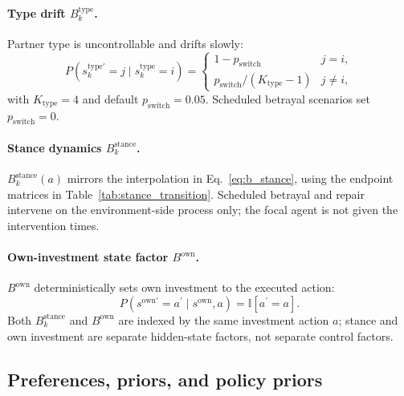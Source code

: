 \paragraph{Type drift \(B_k^{\mathrm{type}}\).}
Partner type is uncontrollable and drifts slowly:
\begin{equation}
P(s_k^{\mathrm{type}\prime}=j\mid s_k^{\mathrm{type}}=i)=
\begin{cases}
1-p_{\mathrm{switch}} & j=i,\\
p_{\mathrm{switch}}/(K_{\mathrm{type}}-1) & j\neq i,
\end{cases}
\label{eq:b_type}
\end{equation}
with $K_{\mathrm{type}}=4$ and default $p_{\mathrm{switch}}=0.05$. Scheduled betrayal scenarios set $p_{\mathrm{switch}}=0$.

\paragraph{Stance dynamics \(B_k^{\mathrm{stance}}\).}
\(B_k^{\mathrm{stance}}(a)\) mirrors the interpolation in Eq.~\eqref{eq:b_stance}, using the endpoint matrices in Table~\ref{tab:stance_transition}. Scheduled betrayal and repair intervene on the environment-side process only; the focal agent is not given the intervention times.

\paragraph{Own-investment state factor \(B^{\mathrm{own}}\).}
\(B^{\mathrm{own}}\) deterministically sets own investment to the executed action:
\begin{equation}
P(s^{\mathrm{own}\prime}=a^\prime \mid s^{\mathrm{own}}, a)=\mathbb{I}[a^\prime=a].
\label{eq:b_own}
\end{equation}
Both \(B_k^{\mathrm{stance}}\) and \(B^{\mathrm{own}}\) are indexed by the same investment action \(a\); stance and own investment are separate hidden-state factors, not separate control factors.

\subsection{Preferences, priors, and policy priors}

